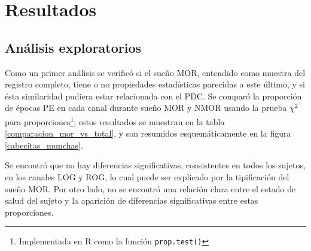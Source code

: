 
\chapter{Resultados}


\section{Análisis exploratorios}

Como un primer análisis se verificó si el sueño MOR, entendido como muestra del registro
completo, tiene o no propiedades estadísticas parecidas a este último, y si ésta similaridad 
pudiera estar relacionada con el PDC. 
Se comparó la proporción de épocas PE en cada canal durante sueño MOR y NMOR usando la 
prueba $\chi^{2}$ para proporciones\footnote{Implementada en R como la función 
\texttt{prop.test()}}; estos resultados se muestran en la tabla \ref{comparacion_mor_vs_total},
y son resumidos esquemáticamente en la figura \ref{cabecitas_munchas}.

Se encontró que no hay diferencias significativas, consistentes en todos los sujetos, en los 
canales LOG y ROG, lo cual puede ser explicado por la tipificación del sueño MOR. 
Por otro lado, no se encontró una relación clara entre el estado de salud del sujeto y la 
aparición de diferencias significativas entre estas proporciones.

